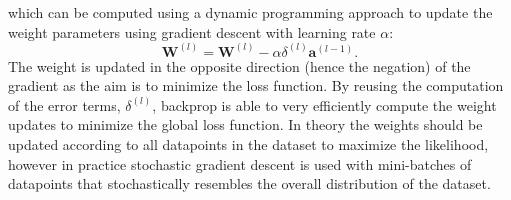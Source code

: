 \documentclass[a4paper,11pt]{article} %
\begin{document}
which can be computed using a dynamic programming approach to update the weight parameters using gradient descent with learning rate $\alpha$:
\begin{equation} \label{eq:weight-update}
  \mathbf{W}^{(l)} = \mathbf{W}^{(l)} -\alpha \delta^{(l)} \mathbf{a}^{(l-1)}.
\end{equation}
The weight is updated in the opposite direction (hence the negation) of the gradient as the aim is to minimize the loss function. By reusing the computation of the error terms, $\delta^{(l)}$, backprop is able to very efficiently compute the weight updates to minimize the global loss function. In theory the weights should be updated according to all datapoints in the dataset to maximize the likelihood, however in practice stochastic gradient descent is used with mini-batches of datapoints that stochastically resembles the overall distribution of the dataset. 
\end{document}
